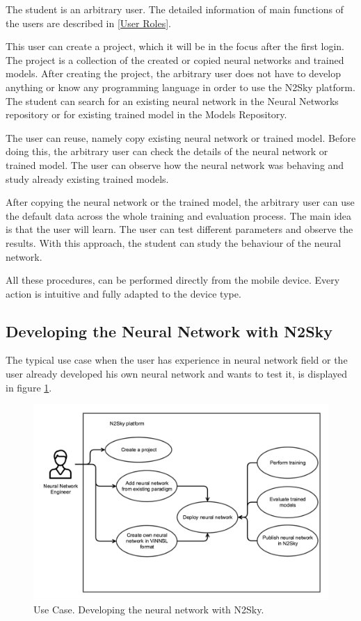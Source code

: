 The student is an arbitrary user. The detailed information of main functions of the users are described in \autoref{User Roles}. 

This user can create a project, which it will be in the focus after the first login. The project is a collection of the created or copied neural networks and trained models. After creating the project, the arbitrary user does not have to develop anything or know any programming language in order to use the N2Sky platform. The student can search for an existing neural network in the Neural Networks repository or for existing trained model in the Models Repository. 

The user can reuse, namely copy existing neural network or trained model. Before doing this, the arbitrary user can check the details of the neural network or trained model.  
The user can observe how the neural network was behaving and study already existing trained models. 

After copying the neural network or the trained model, the arbitrary user can use the default data across the whole training and evaluation process. The main idea is that the user will learn. The user can test different parameters and observe the results. With this approach, the student can study the behaviour of the neural network.

All these procedures, can be performed directly from the mobile device.  Every action is intuitive and fully adapted to the device type.

\subsection{Developing the Neural Network with N2Sky}\label{Developing the neural network with N2Sky}

The typical use case when the user has experience in neural network field or the user already developed his own neural network and wants to test it, is displayed in figure \ref{fig:user_case_engin}.

\begin{figure}[htbp]
\begin{center}
  \includegraphics[width=\linewidth]{components/usecase/img/user_case_engin.png}
  \caption{Use Case. Developing the neural network with N2Sky.}
  \label{fig:user_case_engin}
\end{center}
\end{figure} 

